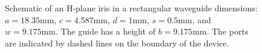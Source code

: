 \begin{figure}[!h]
 \centering
 {}
 \caption{Schematic of an H-plane iris in a rectangular waveguide dimensions: $a=18.35\text{mm}$, $c=4.587\text{mm}$, $d=1\text{mm}$, $s=0.5\text{mm}$, and $w=9.175\text{mm}$. The guide has a height of $b=9.175\text{mm}$. The ports are indicated by dashed lines on the boundary of the device.}
 \label{lezar:fig:h_plane_iris}
\end{figure}

